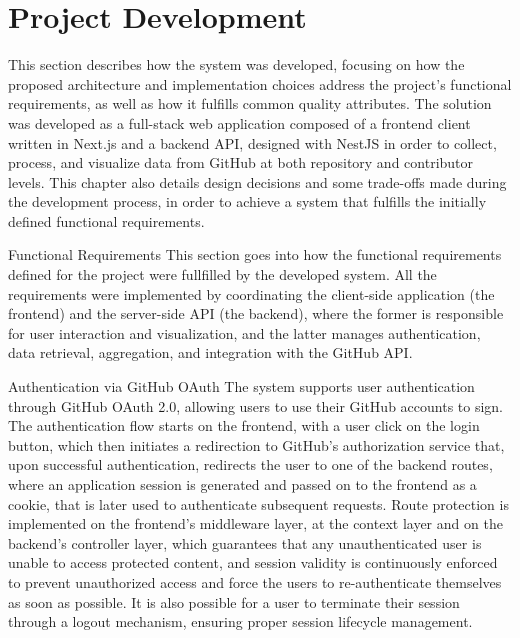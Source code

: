 \documentclass[12pt,reqno, twoside]{amsbook}
\makeatletter
\def\section{\@startsection{section}{1}%
      \z@{.5\linespacing\@plus.7\linespacing}{.25\linespacing}%
      {\normalfont\bfseries\flushleft}}
\def\subsection{\@startsection{subsection}{2}%
      \z@{.5\linespacing\@plus.7\linespacing}{.25\linespacing}%
      {\normalfont\bfseries\flushleft}}
\theoremstyle{plain}
\numberwithin{equation}{chapter}
\numberwithin{section}{chapter}
\makeatother
\begin{document}
\chapter{Project Development}
\noindent This section describes how the system was developed, focusing on how the proposed architecture and implementation choices 
address the project's functional requirements, as well as how it fulfills common quality attributes. The solution was developed as a 
full-stack web application composed of a frontend client written in Next.js and a backend API, designed with NestJS in order to 
collect, process, and visualize data from GitHub at both repository and contributor levels. This chapter also details design 
decisions and some trade-offs made during the development process, in order to achieve a system that fulfills the initially defined functional requirements.

\section{Functional Requirements}
\noindent This section goes into how the functional requirements defined for the project were fullfilled by the developed system. 
All the requirements were implemented by coordinating the client-side application (the frontend) and the server-side API 
(the backend), where the former is responsible for user interaction and visualization, and the latter manages authentication, 
data retrieval, aggregation, and integration with the GitHub API.

\subsection{Authentication via GitHub OAuth}
\noindent The system supports user authentication through GitHub OAuth 2.0, allowing users to use their GitHub accounts to sign.
The authentication flow starts on the frontend, with a user click on the login button, which then initiates a redirection to GitHub’s 
authorization service that, upon successful authentication, redirects the user to one of the backend routes, where an application 
session is generated and passed on to the frontend as a cookie, that is later used to authenticate subsequent requests. Route 
protection is implemented on the frontend's middleware layer, at the context layer and on the backend's controller layer, which 
guarantees that any unauthenticated user is unable to access protected content, and session validity is continuously enforced to 
prevent unauthorized access and force the users to re-authenticate themselves as soon as possible. It is also possible for a user 
to terminate their session through a logout mechanism, ensuring proper session lifecycle management.
\end{document}
